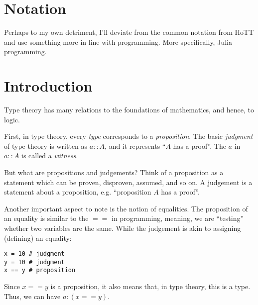 \section*{Notation}

Perhaps to my own detriment, I'll deviate from the common
notation from HoTT and use something more in line with
programming. More specifically, Julia programming.

\section{Introduction}
Type theory has many relations to the foundations of mathematics,
and hence, to logic.

First, in type theory, every \textit{type} corresponds
to a \textit{proposition}. The basic \textit{judgment}
of type theory is written as $a::A$, and it represents
``$A$ has a proof''. The $a$ in $a::A$ is called a \textit{witness}.

But what are propositions and judgements? Think of a proposition
as a statement which can be proven, disproven, assumed, and so on.
A judgement is a statement about a proposition, e.g.
``proposition $A$ has a proof''.

Another important aspect to note is the notion of equalities.
The proposition of an equality is similar to the $==$
in programming, meaning, we are ``testing'' whether two
variables are the same. While the judgement is akin to
assigning (defining) an equality:

\hspace{100mm}
\begin{lstlisting}[language=JuliaLocal, style=julia]
x = 10 # judgment
y = 10 # judgment
x == y # proposition
\end{lstlisting}

Since $x==y$ is a proposition, it also means that, in type theory,
this is a type. Thus, we can have $a:(x==y)$.

